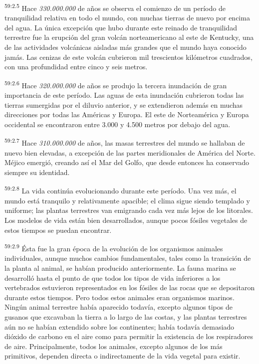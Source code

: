 \par
\textsuperscript{59:2.5} Hace \textit{330.000.000} de años se observa el comienzo de un período de tranquilidad relativa en todo el mundo, con muchas tierras de nuevo por encima del agua. La única excepción que hubo durante este reinado de tranquilidad terrestre fue la erupción del gran volcán norteamericano al este de Kentucky, una de las actividades volcánicas aisladas más grandes que el mundo haya conocido jamás. Las cenizas de este volcán cubrieron mil trescientos kilómetros cuadrados, con una profundidad entre cinco y seis metros.

\par
\textsuperscript{59:2.6} Hace \textit{320.000.000} de años se produjo la tercera inundación de gran importancia de este período. Las aguas de esta inundación cubrieron todas las tierras sumergidas por el diluvio anterior, y se extendieron además en muchas direcciones por todas las Américas y Europa. El este de Norteamérica y Europa occidental se encontraron entre 3.000 y 4.500 metros por debajo del agua.

\par
\textsuperscript{59:2.7} Hace \textit{310.000.000} de años, las masas terrestres del mundo se hallaban de nuevo bien elevadas, a excepción de las partes meridionales de América del Norte. Méjico emergió, creando así el Mar del Golfo, que desde entonces ha conservado siempre su identidad.

\par
\textsuperscript{59:2.8} La vida continúa evolucionando durante este período. Una vez más, el mundo está tranquilo y relativamente apacible; el clima sigue siendo templado y uniforme; las plantas terrestres van emigrando cada vez más lejos de los litorales. Los modelos de vida están bien desarrollados, aunque pocos fósiles vegetales de estos tiempos se puedan encontrar.

\par
\textsuperscript{59:2.9} Ésta fue la gran época de la evolución de los organismos animales individuales, aunque muchos cambios fundamentales, tales como la transición de la planta al animal, se habían producido anteriormente. La fauna marina se desarrolló hasta el punto de que todos los tipos de vida inferiores a los vertebrados estuvieron representados en los fósiles de las rocas que se depositaron durante estos tiempos. Pero todos estos animales eran organismos marinos. Ningún animal terrestre había aparecido todavía, excepto algunos tipos de gusanos que excavaban la tierra a lo largo de las costas, y las plantas terrestres aún no se habían extendido sobre los continentes; había todavía demasiado dióxido de carbono en el aire como para permitir la existencia de los respiradores de aire. Principalmente, todos los animales, excepto algunos de los más primitivos, dependen directa o indirectamente de la vida vegetal para existir.

